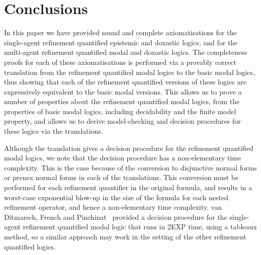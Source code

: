 \chapter{Conclusions}

In this paper we have provided sound and complete axiomatisations for the
single-agent refinement quantified epistemic and doxastic logics, and for the
multi-agent refinement quantified modal and doxastic logics. The completeness
proofs for each of these axiomatisations is performed via a provably correct
translation from the refinement quantified modal logics to the basic modal
logics, thus showing that each of the refinement quantified versions of these
logics are expressively equivalent to the basic modal versions. This allows us
to prove a number of properties about the refinement quantified modal logics,
from the properties of basic modal logics, including decidability and the finite
model property, and allows us to derive model-checking and decision procedures
for these logics via the translations.

Although the translation gives a decision procedure for the refinement
quantified modal logics, we note that the decision procedure has a
non-elementary time complexity. This is the case because of the conversion to
disjunctive normal forms or prenex normal forms in each of the translations.
This conversion must be performed for each refinement quantifier in the original
formula, and results in a worst-case exponential blow-up in the size of the
formula for each nested refinement operator, and hence a non-elementary time
complexity. van Ditmarsch, French and Pinchinat~\cite{french2010future} provided
a decision procedure for the single-agent refinement quantified modal logic that
runs in 2EXP time, using a tableaux method, so a similar approach may work in
the setting of the other refinement quantified logics.


